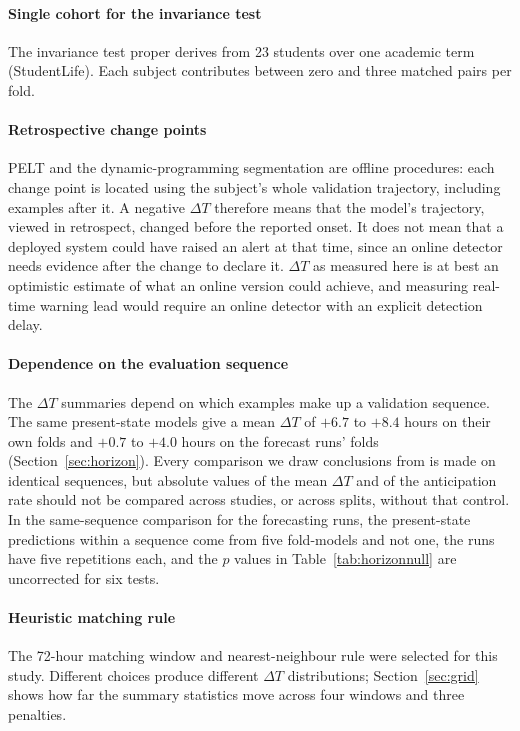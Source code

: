 \documentclass[preprint,12pt,authoryear]{elsarticle}
\newcommand{\dt}{$\Delta T$}
\begin{document}
\paragraph{Single cohort for the invariance test} The invariance test
proper derives from 23 students over one academic term (StudentLife).
Each subject contributes between zero and three matched pairs per fold.

\paragraph{Retrospective change points} PELT and the dynamic-programming
segmentation are offline procedures: each change point is located
using the subject's whole validation trajectory, including examples
after it. A negative \dt{} therefore means that the model's trajectory,
viewed in retrospect, changed before the reported onset. It does not
mean that a deployed system could have raised an alert at that time,
since an online detector needs evidence after the change to declare
it. \dt{} as measured here is at best an optimistic estimate of what
an online version could achieve, and measuring real-time warning lead would require an
online detector with an explicit detection delay.

\paragraph{Dependence on the evaluation sequence} The \dt{} summaries
depend on which examples make up a validation sequence. The same
present-state models give a mean \dt{} of $+6.7$ to $+8.4$ hours on
their own folds and $+0.7$ to $+4.0$ hours on the forecast runs' folds
(Section~\ref{sec:horizon}). Every comparison we draw conclusions from
is made on identical sequences, but absolute values of the mean \dt{}
and of the anticipation rate should not be compared across studies, or
across splits, without that control. In the same-sequence comparison
for the forecasting runs, the present-state predictions within a
sequence come from five fold-models and not one, the runs have five
repetitions each, and the $p$ values in Table~\ref{tab:horizonnull} are
uncorrected for six tests.

\paragraph{Heuristic matching rule} The 72-hour matching window and
nearest-neighbour rule were selected for this study. Different choices
produce different \dt{} distributions; Section~\ref{sec:grid} shows how
far the summary statistics move across four windows and three
penalties.
\end{document}
